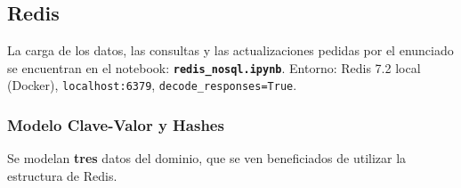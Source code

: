 \documentclass[11pt,a4paper]{article}
\begin{document}
\subsection{Redis}

La carga de los datos, las consultas y las actualizaciones pedidas por el enunciado se
encuentran en el notebook: \textbf{\texttt{redis\_nosql.ipynb}}. Entorno: Redis 7.2 local
(Docker), \texttt{localhost:6379}, \texttt{decode\_responses=True}.

\subsubsection{Modelo Clave-Valor y Hashes}

Se modelan \textbf{tres} datos del dominio, que se ven beneficiados de utilizar la
estructura de Redis.
\end{document}
